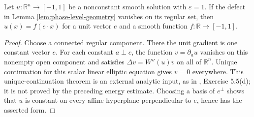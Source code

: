 \begin{lemma}\label{lem:phase-flat-to-onedimensional}
Let $u:\mathbb R^n\to[-1,1]$ be a nonconstant smooth solution with $\varepsilon=1$. If the defect in Lemma \ref{lem:phase-level-geometry} vanishes on its regular set, then $u(x)=f(e\cdot x)$ for a unit vector $e$ and a smooth function $f:\mathbb R\to[-1,1]$.
\end{lemma}
\begin{proof}
Choose a connected regular component. There the unit gradient is one constant vector $e$. For each constant $a\perp e$, the function $v=\partial_a u$ vanishes on this nonempty open component and satisfies $\Delta v=W''(u)v$ on all of $\mathbb R^n$. Unique continuation for this scalar linear elliptic equation gives $v=0$ everywhere. This unique-continuation theorem is an external analytic input, as in \cite{ChAC}, Exercise 5.5(d); it is not proved by the preceding energy estimate. Choosing a basis of $e^\perp$ shows that $u$ is constant on every affine hyperplane perpendicular to $e$, hence has the asserted form.
\end{proof}

